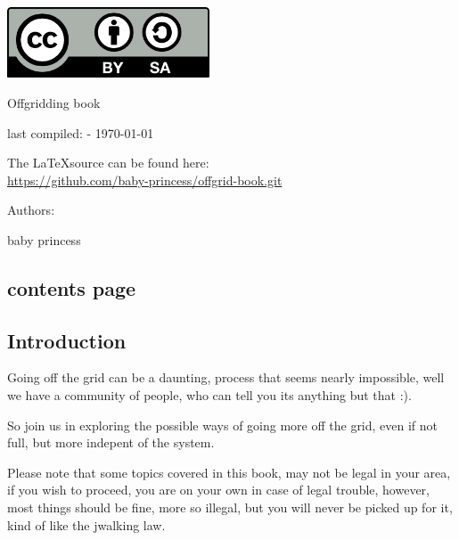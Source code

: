 \documentclass[a4paper,12pt,titlepage]{article}
\begin{document}
\begin{titlepage}
\centering\includegraphics[width=6cm]{CC-SA.png}\\
	\vspace{1.5cm}
	{\huge	Offgridding book\par}
	
	{\large last compiled: \currenttime	-	\today\par}
	\vspace{1cm}
	{\large The \LaTeX source can be found here:\\	
	\url{https://github.com/baby-princess/offgrid-book.git}\par}
	\vspace{3cm}
	{\large Authors:\par}
	{\Large baby princess\\
	\par}
\end{titlepage}
	\newpage
\begin{centering}
\section{contents page}
\end{centering}
\tableofcontents
\newpage
\begin{centering}
\section{Introduction}
\end{centering}
Going off the grid can be a daunting, process that seems nearly impossible, well we have a community of people, who can tell you its anything but that :).


So join us in exploring the possible ways of going more off the grid, even if not full, but more indepent of the system.

Please note that some topics covered in this book, may not be legal in your area, if you wish to proceed, you are on your own in case of legal trouble, however, most things should be fine, more so illegal, but you will never be picked up for it, kind of like the jwalking law.
\newpage

% 
\end{document}
